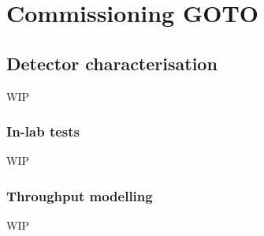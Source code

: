 \chapter{Commissioning GOTO}
\label{chap:commissioning}
\chaptoc{}


\newpage
\section{Detector characterisation}
\label{sec:detectors}
\begin{colsection}


\begin{colsection}

WIP

\end{colsection}

\subsection{In-lab tests}
\label{sec:detector_tests}
\begin{colsection}

WIP

\end{colsection}

\subsection{Throughput modelling}
\label{sec:throughput}
\begin{colsection}

WIP

\end{colsection}


\end{colsection}


\newpage
